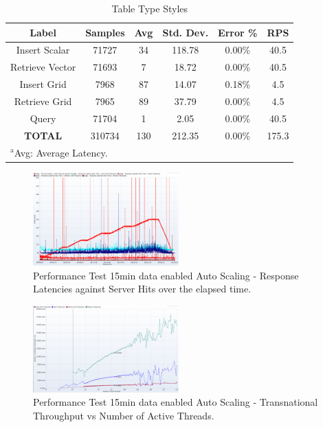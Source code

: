 \documentclass[conference]{IEEEtran}
\begin{document}
\begin{table}[htbp]
\caption{Table Type Styles}
\begin{center}
\begin{tabular}{|c|c|c|c|c|c|}
\hline
\textbf{Label} & \textbf{Samples} & \textbf{Avg} & \textbf{Std. Dev.} & \textbf{Error \%} & \textbf{RPS} \\ \hline
Insert Scalar & 71727 & 34 & 118.78 & 0.00\% & 40.5 \\ \hline
Retrieve Vector & 71693 & 7 & 18.72 & 0.00\% & 40.5 \\ \hline
Insert Grid & 7968 & 87 & 14.07 & 0.18\% & 4.5 \\ \hline
Retrieve Grid & 7965 & 89 & 37.79 & 0.00\% & 4.5 \\ \hline
Query & 71704 & 1 & 2.05 & 0.00\% & 40.5 \\ \hline
\textbf{TOTAL} & 310734 & 130 & 212.35 & 0.00\% & 175.3 \\ \hline
\multicolumn{4}{l}{$^{\mathrm{a}}$Avg: Average Latency.}
\end{tabular}
\label{tab:obs_all_auto_15_min_summary_throughput}
\end{center}
\end{table}

\begin{figure}[htbp]
\centerline{\includegraphics[width=0.5\textwidth]{results/obs/all_auto/obs_all_auto_15m_res_latencies_against_hits.png}}
\caption{Performance Test 15min data enabled Auto Scaling - Response Latencies against Server Hits over the elapsed time.}
\label{fi:test_obs_auto_all_15_min_latency_vs_hits}
\end{figure}

\begin{figure}[htbp]
\centerline{\includegraphics[width=0.5\textwidth]{results/obs/all_auto/obs_all_auto_15m_transaction_throughtput_vs_threads.png}}
\caption{Performance Test 15min data enabled Auto Scaling - Transnational Throughput vs Number of Active Threads.}
\label{fi:test_obs_auto_all_15_min_throughput_vs_threads}
\end{figure}
\end{document}
